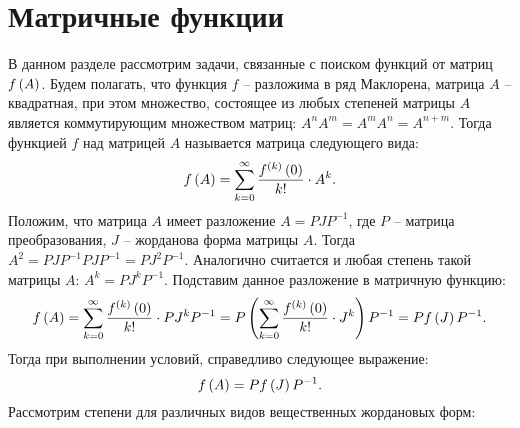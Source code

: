 \section{Матричные функции}

	В данном разделе рассмотрим задачи, связанные с поиском функций от матриц $f\left( A \right)$. Будем полагать, что функция $f$ -- разложима в ряд Маклорена, матрица $A$ -- квадратная, при этом множество, состоящее из любых степеней матрицы $A$ является коммутирующим множеством матриц: $A^n A^m = A^m A^n = A^{n+m}$. Тогда функцией $f$ над матрицей $A$ называется матрица следующего вида:
	\[ f\left( A \right) = \sum_{k = 0}^{\infty} \frac{f^{(k)}\left( 0 \right)}{k!} \cdot A^k. \]
	Положим, что матрица $A$ имеет разложение $A = PJP^{-1}$, где $P$ -- матрица преобразования, $J$ -- жорданова форма матрицы $A$. Тогда $A^2 = PJP^{-1} PJP^{-1} = PJ^2P^{-1}$. Аналогично считается и любая степень такой матрицы $A$: $A^k = P J^k P^{-1}$. Подставим данное разложение в матричную функцию:
	\[ f\left( A \right) =  \sum_{k=0}^{\infty} \frac{f^{(k)}\left( 0 \right)}{k!} \cdot PJ^kP^{-1} = P \left( \sum_{k=0}^{\infty} \frac{f^{(k)}\left( 0 \right)}{k!} \cdot J^k \right) P^{-1} = P f\left( J \right) P^{-1}. \]
	Тогда при выполнении условий, справедливо следующее выражение:
	\[ f\left( A \right) = P f\left( J \right) P^{-1}. \]
	Рассмотрим степени для различных видов вещественных жордановых форм:
